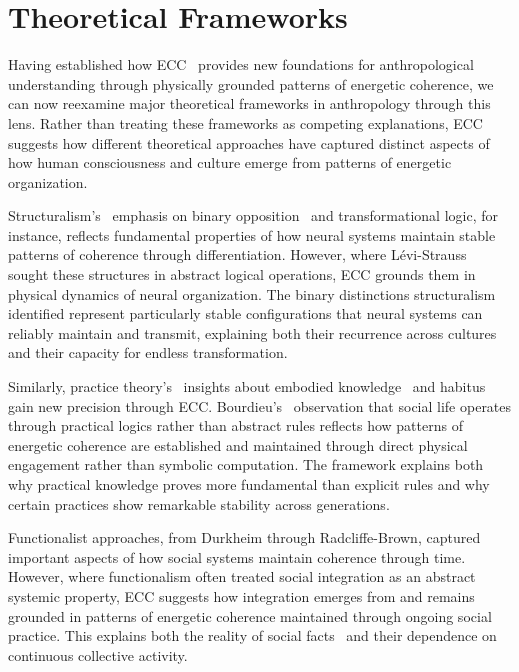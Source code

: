 \section{Theoretical Frameworks}

Having established how ECC~ provides new foundations for anthropological understanding through physically grounded patterns of energetic coherence, we can now reexamine major theoretical frameworks in anthropology through this lens. Rather than treating these frameworks as competing explanations, ECC suggests how different theoretical approaches have captured distinct aspects of how human consciousness and culture emerge from patterns of energetic organization.

Structuralism's~ emphasis on binary opposition~ and transformational logic, for instance, reflects fundamental properties of how neural systems maintain stable patterns of coherence through differentiation. However, where Lévi-Strauss~\cite{levistrauss1963structural} sought these structures in abstract logical operations, ECC grounds them in physical dynamics of neural organization. The binary distinctions structuralism identified represent particularly stable configurations that neural systems can reliably maintain and transmit, explaining both their recurrence across cultures and their capacity for endless transformation.

Similarly, practice theory's~ insights about embodied knowledge~ and habitus~ gain new precision through ECC. Bourdieu's~\cite{bourdieu1977outline} observation that social life operates through practical logics rather than abstract rules reflects how patterns of energetic coherence are established and maintained through direct physical engagement rather than symbolic computation. The framework explains both why practical knowledge proves more fundamental than explicit rules and why certain practices show remarkable stability across generations.

Functionalist approaches, from Durkheim through Radcliffe-Brown, captured important aspects of how social systems maintain coherence through time. However, where functionalism often treated social integration as an abstract systemic property, ECC suggests how integration emerges from and remains grounded in patterns of energetic coherence maintained through ongoing social practice. This explains both the reality of social facts~ and their dependence on continuous collective activity.

